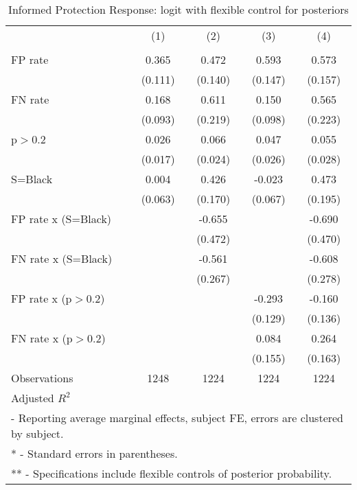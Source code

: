 \begin{table}[htbp]\centering
\caption{Informed Protection Response: logit with flexible control for posteriors}
\begin{tabular}{l*{4}{c}}
\hline\hline
                &\multicolumn{1}{c}{(1)}&\multicolumn{1}{c}{(2)}&\multicolumn{1}{c}{(3)}&\multicolumn{1}{c}{(4)}\\
                &\multicolumn{1}{c}{}&\multicolumn{1}{c}{}&\multicolumn{1}{c}{}&\multicolumn{1}{c}{}\\
\hline
FP rate         &    0.365&    0.472&    0.593&    0.573\\
                &  (0.111)&  (0.140)&  (0.147)&  (0.157)\\
FN rate         &    0.168&    0.611&    0.150&    0.565\\
                &  (0.093)&  (0.219)&  (0.098)&  (0.223)\\
p$>$0.2         &    0.026&    0.066&    0.047&    0.055\\
                &  (0.017)&  (0.024)&  (0.026)&  (0.028)\\
S=Black         &    0.004&    0.426&   -0.023&    0.473\\
                &  (0.063)&  (0.170)&  (0.067)&  (0.195)\\
FP rate x (S=Black)&         &   -0.655&         &   -0.690\\
                &         &  (0.472)&         &  (0.470)\\
FN rate x (S=Black)&         &   -0.561&         &   -0.608\\
                &         &  (0.267)&         &  (0.278)\\
FP rate x (p$>$0.2)&         &         &   -0.293&   -0.160\\
                &         &         &  (0.129)&  (0.136)\\
FN rate x (p$>$0.2)&         &         &    0.084&    0.264\\
                &         &         &  (0.155)&  (0.163)\\
\hline
Observations    &     1248&     1224&     1224&     1224\\
Adjusted \(R^{2}\)&         &         &         &         \\
\hline\hline
\multicolumn{5}{l}{\footnotesize * - Reporting average marginal effects, subject FE, errors are clustered by subject.}\\
\multicolumn{5}{l}{\footnotesize ** - Standard errors in parentheses.}\\
\multicolumn{5}{l}{\footnotesize *** - Specifications include flexible controls of posterior probability.}\\
\end{tabular}
\end{table}
